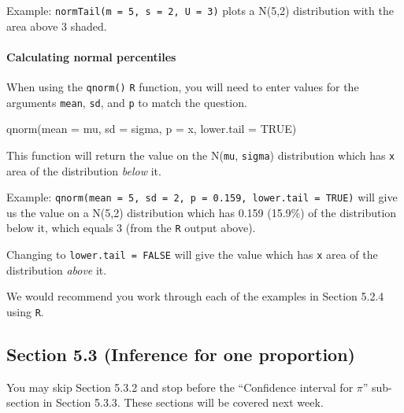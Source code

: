 \documentclass[
]{report}
\newenvironment{Shaded}{\begin{snugshade}}{\end{snugshade}}
\newcommand{\AttributeTok}[1]{\textcolor[rgb]{0.77,0.63,0.00}{#1}}
\newcommand{\ConstantTok}[1]{\textcolor[rgb]{0.00,0.00,0.00}{#1}}
\newcommand{\FunctionTok}[1]{\textcolor[rgb]{0.00,0.00,0.00}{#1}}
\newcommand{\NormalTok}[1]{#1}
\begin{document}
Example: \texttt{normTail(m\ =\ 5,\ s\ =\ 2,\ U\ =\ 3)} plots a N(5,2) distribution with the area above 3 shaded.

\hypertarget{calculating-normal-percentiles}{%
\paragraph*{Calculating normal percentiles}\label{calculating-normal-percentiles}}

When using the \texttt{qnorm()} \texttt{R} function, you will need to enter values for the arguments \texttt{mean}, \texttt{sd}, and \texttt{p} to match the question.

\begin{Shaded}
\begin{Highlighting}[]
\FunctionTok{qnorm}\NormalTok{(}\AttributeTok{mean =}\NormalTok{ mu, }\AttributeTok{sd =}\NormalTok{ sigma, }\AttributeTok{p =}\NormalTok{ x, }\AttributeTok{lower.tail =} \ConstantTok{TRUE}\NormalTok{)}
\end{Highlighting}
\end{Shaded}

This function will return the value on the N(\texttt{mu}, \texttt{sigma}) distribution which has \texttt{x} area of the distribution \emph{below} it.

Example: \texttt{qnorm(mean\ =\ 5,\ sd\ =\ 2,\ p\ =\ 0.159,\ lower.tail\ =\ TRUE)} will give us the value on a N(5,2) distribution which has 0.159 (15.9\%) of the distribution below it, which equals 3 (from the \texttt{R} output above).

Changing to \texttt{lower.tail\ =\ FALSE} will give the value which has \texttt{x} area of the distribution \emph{above} it.

We would recommend you work through each of the examples in Section 5.2.4 using \texttt{R}.

\hypertarget{section-5.3-inference-for-one-proportion}{%
\subsection*{Section 5.3 (Inference for one proportion)}\label{section-5.3-inference-for-one-proportion}}


You may skip Section 5.3.2 and stop before the ``Confidence interval for \(\pi\)'' sub-section in Section 5.3.3. These sections will be covered next week.
\end{document}
